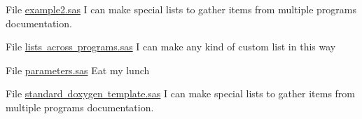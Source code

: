 
\begin{DoxyRefList}
\item[File \mbox{\hyperlink{example2_8sas}{example2.sas}} ]\label{special__special000001}%
%
 I can make special lists to gather items from multiple programs documentation. 
\item[File \mbox{\hyperlink{lists_01across_01programs_8sas}{lists across programs.sas}} ]\label{special__special000002}%
%
 I can make any kind of custom list in this way 


\item[File \mbox{\hyperlink{parameters_8sas}{parameters.sas}} ]\label{special__special000003}%
%
 Eat my lunch  
\item[File \mbox{\hyperlink{standard_01doxygen_01template_8sas}{standard doxygen template.sas}} ]\label{special__special000004}%
%
 I can make special lists to gather items from multiple programs documentation.
\end{DoxyRefList}